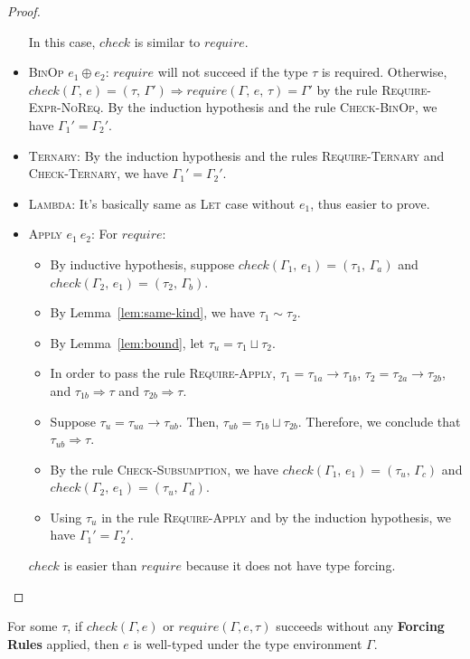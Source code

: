 \documentclass[peerreview, 10pt]{IEEEtran}
\newcommand{\binop}[2]{\ensuremath{#1\ \mathsf{\oplus}\ #2}}
\newcommand{\apply}[2]{\ensuremath{#1\ #2}}
\newcommand{\arrowt}[2]{\ensuremath{{#1}\rightarrow{#2}}}
\newcommand{\checktype}[4]{\ensuremath{{check}(#1,\,#2)=(#3,\,#4)}}
\newcommand{\requiretype}[4]{\ensuremath{{require}(#1,\,#2,\,#3)=#4}}
\newcommand{\forcerequire}[2]{\ensuremath{#1\Rightarrow#2}}
\begin{document}
\begin{proof}
\begin{itemize}
        In this case, $check$ is similar to $require$.
        \item \textsc{BinOp} \binop{e_1}{e_2}: $require$ will not succeed if the type $\tau$ is required. Otherwise, $\checktype{\Gamma}{e}{\tau}{\Gamma'}\Rightarrow\requiretype{\Gamma}{e}{\tau}{\Gamma'}$ by the rule \textsc{Require-Expr-NoReq}. By the induction hypothesis and the rule \textsc{Check-BinOp}, we have $\Gamma_1'=\Gamma_2'$.
        \item \textsc{Ternary}: By the induction hypothesis and the rules \textsc{Require-Ternary} and \textsc{Check-Ternary}, we have $\Gamma_1'=\Gamma_2'$.
        \item \textsc{Lambda}: It's basically same as \textsc{Let} case without $e_1$, thus easier to prove.
        \item \textsc{Apply} \apply{e_1}{e_2}: For $require$:
        \begin{itemize}
            \item By inductive hypothesis, suppose $\checktype{\Gamma_1}{e_1}{\tau_1}{\Gamma_a}$ and $\checktype{\Gamma_2}{e_1}{\tau_2}{\Gamma_b}$.
            \item By Lemma~\ref{lem:same-kind}, we have $\tau_1\sim\tau_2$.
            \item By Lemma~\ref{lem:bound}, let $\tau_u=\tau_1\sqcup\tau_2$. 
            \item In order to pass the rule \textsc{Require-Apply}, $\tau_1=\arrowt{\tau_{1a}}{\tau_{1b}}$, $\tau_2=\arrowt{\tau_{2a}}{\tau_{2b}}$, and $\forcerequire{\tau_{1b}}{\tau}$ and $\forcerequire{\tau_{2b}}{\tau}$.
            \item Suppose $\tau_u=\arrowt{\tau_{ua}}{\tau_{ub}}$. Then, $\tau_{ub}=\tau_{1b}\sqcup\tau_{2b}$. Therefore, we conclude that $\forcerequire{\tau_{ub}}{\tau}$.
            \item By the rule \textsc{Check-Subsumption}, we have $\checktype{\Gamma_1}{e_1}{\tau_u}{\Gamma_c}$ and $\checktype{\Gamma_2}{e_1}{\tau_u}{\Gamma_d}$.
            \item Using $\tau_u$ in the rule \textsc{Require-Apply} and by the induction hypothesis, we have $\Gamma_1'=\Gamma_2'$.
        \end{itemize}
        $check$ is easier than $require$ because it does not have type forcing.
    \end{itemize}
\end{proof}

\begin{theorem}
    \label{thm:check-well-typed}
    For some $\tau$, if $check(\Gamma, e)$ or $require(\Gamma, e, \tau)$ succeeds without any \textbf{Forcing Rules} applied, then $e$ is well-typed under the type environment $\Gamma$.
\end{theorem}
\end{document}
